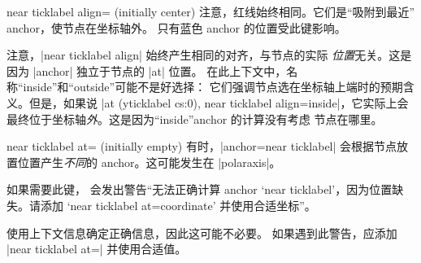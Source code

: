 \begin{pgfplotskey}{near ticklabel align= (initially center)}
    注意，红线始终相同。它们是``吸附到最近'' anchor，使节点在坐标轴外。
    只有蓝色 anchor 的位置受此键影响。

    注意，|near ticklabel align| 始终产生相同的对齐，与节点的实际
    \emph{位置}无关。这是因为 |anchor| 独立于节点的 |at| 位置。
    在此上下文中，名称``inside''和``outside''可能不是好选择：
    它们强调节点选在坐标轴上端时的预期含义。但是，如果说
    |at (yticklabel cs:0), near ticklabel align=inside|，它实际上会
    最终位于坐标轴\emph{外}。这是因为``inside''anchor 的计算没有考虑
    节点在哪里。
\end{pgfplotskey}

\begin{pgfplotskey}{near ticklabel at= (initially empty)}
    有时，|anchor=near ticklabel| 会根据节点放置位置产生\emph{不同}的
    anchor。这可能发生在 |polaraxis|。

    如果需要此键，\PGFPlots{} 会发出警告``无法正确计算 anchor
    `near ticklabel'，因为位置缺失。请添加 `near ticklabel at=coordinate'
    并使用合适坐标''。

    \PGFPlots{} 使用上下文信息确定正确信息，因此这可能不必要。
    如果遇到此警告，应添加 |near ticklabel at=| 并使用合适值。
\end{pgfplotskey}


